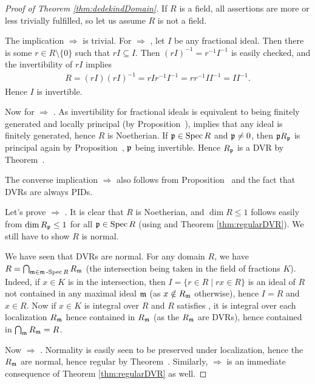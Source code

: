 \documentclass[a4paper,parskip=half,numbers=enddot, DIV=12]{scrreprt}
\begin{document}
\begin{proof}[Proof of Theorem \ref{thm:dedekindDomain}]
If $R$ is a field, all assertions are more or less trivially fulfilled, so let us assume $R$ is not a field.

The implication  $\Rightarrow$  is trivial. For  $\Rightarrow$ , let $I$ be any fractional ideal. Then there is some $r\in R\setminus\{0\}$ such
that $rI\subseteq I$. Then $(rI)^{-1} = r^{-1} I^{-1}$ is easily checked,
and the invertibility of $rI$ implies
\begin{align*}
R = (rI)(rI)^{-1} = r I r^{-1} I^{-1} = rr^{-1} I I^{-1} = I I^{-1}.
\end{align*}
Hence $I$ is invertible.

Now for  $\Rightarrow$ . As invertibility for fractional ideals is equivalent to being finitely generated and locally principal
(by Proposition~),
 implies that any ideal is finitely generated, hence
$R$ is Noetherian. If $\mathfrak{p} \in \operatorname{Spec} R$ and $\mathfrak{p}\neq 0$, then  $\mathfrak{p} R_{\mathfrak{p}}$ is principal again by Proposition~, $\mathfrak{p}$ being invertible.  Hence $R_{\mathfrak{p}}$ is a DVR by Theorem~. 

The converse implication  $\Rightarrow$  also follows from Proposition~ and the fact that DVRs are always PIDs.

Let's prove  $\Rightarrow$ . It is clear that $R$ is Noetherian, and $\dim R\leq 1$ follows easily from
$\dim R_{\mathfrak{p}}\leq 1$ for all $\mathfrak{p}\in \operatorname{Spec} R$ (using  and Theorem \ref{thm:regularDVR}). We still have to show $R$ is normal.

We have seen that DVRs are normal. For any domain $R$, we have $R=\bigcap_{\mathfrak{m} \in \mathfrak{m}\operatorname{-Spec} R} R_{\mathfrak{m}}$ (the intersection being
taken in the field of fractions $K$). Indeed, if $x\in K$
is in the intersection, then $I=\{r\in R \mid rx\in R\}$ is an ideal of $R$ not contained
in any maximal ideal $\mathfrak{m}$ (as $x\notin R_{\mathfrak{m}}$ otherwise), hence $I=R$ and $x\in R$. 
Now if $x\in K$ is integral over $R$ and $R$ satisfies , it is integral over each localization $R_{\mathfrak{m}}$ hence contained in $R_{\mathfrak{m}}$ (as the $R_{\mathfrak{m}}$ are DVRs),
hence contained in $\bigcap_{\mathfrak{m}} R_{\mathfrak{m}} = R$.

Now  $\Rightarrow$ . Normality is easily seen to be preserved under localization, hence the $R_{\mathfrak{m}}$ are normal, hence
regular by Theorem~. Similarly,  $\Rightarrow$  is an immediate consequence of Theorem \ref{thm:regularDVR} as well.


\end{proof}
\end{document}
